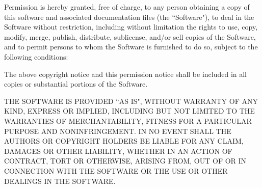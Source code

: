 \documentclass[12pt,titlepage,a4paper]{article}
\begin{document}
\bigskip
Permission is hereby granted, free of charge, to any person obtaining a copy of this software and associated documentation files (the ``Software"), to deal in the Software without restriction, including without limitation the rights to use, copy, modify, merge, publish, distribute, sublicense, and/or sell copies of the Software, and to permit persons to whom the Software is furnished to do so, subject to the following conditions:

\bigskip
The above copyright notice and this permission notice shall be included in all copies or substantial portions of the Software.

\bigskip
THE SOFTWARE IS PROVIDED ``AS IS", WITHOUT WARRANTY OF ANY KIND, EXPRESS OR IMPLIED, INCLUDING BUT NOT LIMITED TO THE WARRANTIES OF MERCHANTABILITY, FITNESS FOR A PARTICULAR PURPOSE AND NONINFRINGEMENT. IN NO EVENT SHALL THE AUTHORS OR COPYRIGHT HOLDERS BE LIABLE FOR ANY CLAIM, DAMAGES OR OTHER LIABILITY, WHETHER IN AN ACTION OF CONTRACT, TORT OR OTHERWISE, ARISING FROM, OUT OF OR IN CONNECTION WITH THE SOFTWARE OR THE USE OR OTHER DEALINGS IN THE SOFTWARE.  


\newpage


\end{document}
